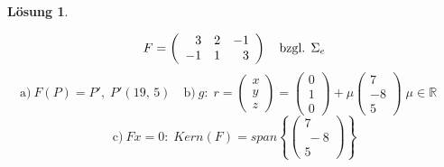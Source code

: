 \documentclass[10pt]{article}
\newtheorem{Lo}{L\"osung}
\newcommand{\R}{{\mathbb R}}
\newcommand{\VS}{\vspace{1cm}}
\begin{document}
\begin{sffamily}
\begin{Lo}  \end{Lo}
\[
 F = \left(\begin{array}{r r r}
                                   3 & 2 & -1\\
                   -1 & 1 & 3
                                \end{array}
\right)\quad\textrm{bzgl. $\Sigma_e$}
\]
\[
\textrm{a)}\: F(P) = P',\; P'(19,\,5)\quad \textrm{b)}\:g:\; r =
\left(\begin{array}{r}
                             x\\y\\z
                            \end{array}
                             \right) =
                           \left(\begin{array}{r}
                             0\\1\\0
                            \end{array}
                             \right) + \mu
                 \left(\begin{array}{r}
                             7\\-8\\5
                            \end{array}
                             \right)\;\mu\in\R\quad
\]
\[
\textrm{c)}\: F x = 0:\;Kern(F)= span\left\{ \left(\begin{array}{r} 7 \\\ -8 \\5 \end{array} \right)
\right\}
\]


\end{sffamily}
\end{document}
